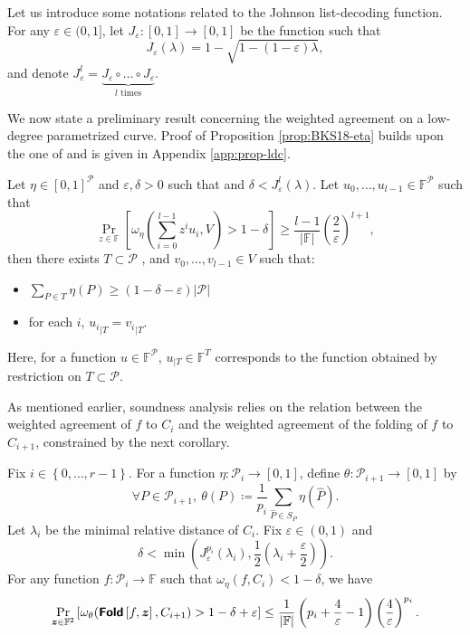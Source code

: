 \documentclass[10pt,a4paper]{article}
\renewcommand\epsilon{\varepsilon}
\renewcommand\hat{\widehat}
\newcommand\F{\mathbb{F}}
\newcommand\fold[1]{\textsf{\textbf{Fold}}\left[#1\right]}
\renewcommand{\hat}{\widehat}
\def\rest#1#2{{{#1}_{|#2}}}
\renewcommand{\vec}[1]{\boldsymbol{#1}}
\newcommand{\set}[1]{\left\{#1\right\}}
\newcommand{\size}[1]{\left|#1\right|}
\newcommand{\range}[1]{\set{0,\dots,#1-1}}
\newcommand\bfz{{\vec{z}}}
\newcommand\calP{\mathcal{P}}
\newcommand\mydef{\coloneqq}
\theoremstyle{plain}
\theoremstyle{plain}
\theoremstyle{definition}
\theoremstyle{remark}
\theoremstyle{plain}
\begin{document}
Let us introduce some notations related to the Johnson list-decoding function. For any $\epsilon \in (0,1]$, let $J_\epsilon : [0,1] \rightarrow [0,1]$ be the function such that \[J_\epsilon(\lambda) = 1 - \sqrt{1 - (1 - \epsilon)\lambda},\] and denote $J_{\epsilon}^{l} = \underbrace{J_\epsilon \circ \dots \circ J_\epsilon}_{\text{$l$ times}}$.

We now state a preliminary result concerning the weighted agreement on a low-degree parametrized curve. Proof of Proposition \ref{prop:BKS18-eta} builds upon the one of \cite[Theorem~4.5]{BKS18} and is given in Appendix \ref{app:prop-ldc}.

\begin{proposition}\label{prop:BKS18-eta}
	Let $\eta \in [0,1]^\calP$ and $\epsilon,\delta>0$ such that and $\delta < J_{\epsilon}^l(\lambda)$.
	Let ${u_0, \ldots, u_{l-1} \in \F^\calP}$ such that
	\begin{equation}\label{eq:pr-randcombi-weighted}
		\Pr_{z \in \F }\left[\omega_\eta\left(\sum_{i = 0}^{l - 1} z^i u_i, V\right)>1-\delta \right]\geq \frac{l-1}{|\F|}\left(\frac{2}{\epsilon}\right)^{l+1},
	\end{equation}
	then there exists $T \subset \calP$ , and $v_0, \ldots, v_{l-1} \in V$ such that:
	\begin{itemize}
		\item $\sum_{P\in T} \eta(P) \ge (1 - \delta - \epsilon)|\calP|$
		\item for each $i$, $\rest{u_i}{T} = \rest{v_i}{T}$.
	\end{itemize}
\end{proposition}

Here, for a function $u \in \F^\calP$, $\rest{u}{T} \in \F^T$ corresponds to the function obtained by restriction on $T \subset \calP$.

As mentioned earlier, soundness analysis relies on the relation between the weighted agreement of $f$ to $C_i$ and the weighted agreement of the folding of $f$ to $C_{i+1}$, constrained by the next corollary.

\begin{corollary}\label{coro:pre-soundness}
	Fix $i \in \range{r}$. For a function $\eta : \calP_i \rightarrow [0,1]$, define ${\theta : \calP_{i+1} \rightarrow [0,1]}$ by
	\[\forall P \in \calP_{i+1}, \: \theta(P)\mydef\frac{1}{p_i} \sum_{\hat{P} \in S_P} \eta(\hat{P}).\] 
	Let $\lambda_i$ be the minimal relative distance of $C_i$. Fix $\epsilon \in (0,1)$ and \[\delta < \min\left(J_{\epsilon}^{p_i}(\lambda_i), \frac{1}{2}\left( \lambda_i + \frac{\epsilon}{2} \right) \right).\] For any function $f : \calP_i \rightarrow \F$ such that $\omega_\eta(f, C_i) < 1-\delta$, we have
	\[
	\Pr_{\bfz \in \F^2}\left[\omega_\theta(\fold{f, \bfz}, C_{i+1}) > 1 - \delta + \epsilon\right] \leq 
	\frac{1}{\size \F}\left(p_i + \frac{4}{\epsilon} - 1\right)\left(\frac{4}{\epsilon}\right)^{p_i}.
	\]
\end{corollary}
\end{document}
